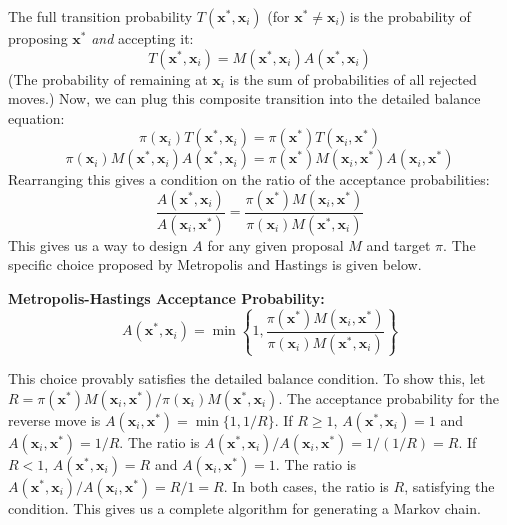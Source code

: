 The full transition probability $T(\mathbf{x}^*, \mathbf{x}_i)$ (for $\mathbf{x}^* \neq \mathbf{x}_i$) is the probability of proposing $\mathbf{x}^*$ \emph{and} accepting it:
\begin{equation}
    T(\mathbf{x}^*, \mathbf{x}_i) = M(\mathbf{x}^*, \mathbf{x}_i) A(\mathbf{x}^*, \mathbf{x}_i)
\end{equation}
(The probability of remaining at $\mathbf{x}_i$ is the sum of probabilities of all rejected moves.) Now, we can plug this composite transition into the detailed balance equation:
\begin{equation}
    \pi(\mathbf{x}_i) T(\mathbf{x}^*, \mathbf{x}_i) = \pi(\mathbf{x}^*) T(\mathbf{x}_i, \mathbf{x}^*)
\end{equation}
\begin{equation}
    \pi(\mathbf{x}_i) M(\mathbf{x}^*, \mathbf{x}_i) A(\mathbf{x}^*, \mathbf{x}_i) = \pi(\mathbf{x}^*) M(\mathbf{x}_i, \mathbf{x}^*) A(\mathbf{x}_i, \mathbf{x}^*)
\end{equation}
Rearranging this gives a condition on the ratio of the acceptance probabilities:
\begin{equation}
    \frac{A(\mathbf{x}^*, \mathbf{x}_i)}{A(\mathbf{x}_i, \mathbf{x}^*)} = \frac{\pi(\mathbf{x}^*) M(\mathbf{x}_i, \mathbf{x}^*)}{\pi(\mathbf{x}_i) M(\mathbf{x}^*, \mathbf{x}_i)}
\end{equation}
This gives us a way to design $A$ for any given proposal $M$ and target $\pi$. The specific choice proposed by Metropolis and Hastings is given below.
\begin{definitionBox}
    \textbf{Metropolis-Hastings Acceptance Probability:}
    \begin{equation}
        A(\mathbf{x}^*, \mathbf{x}_i) = \min \left\{ 1, \frac{\pi(\mathbf{x}^*) M(\mathbf{x}_i, \mathbf{x}^*)}{\pi(\mathbf{x}_i) M(\mathbf{x}^*, \mathbf{x}_i)} \right\}
    \end{equation}
\end{definitionBox}
This choice provably satisfies the detailed balance condition. To show this, let $R = \pi(\mathbf{x}^*) M(\mathbf{x}_i, \mathbf{x}^*)/\pi(\mathbf{x}_i) M(\mathbf{x}^*, \mathbf{x}_i)$. The acceptance probability for the reverse move is $A(\mathbf{x}_i, \mathbf{x}^*) = \min\{1, 1/R\}$. If $R \geq 1$, $A(\mathbf{x}^*, \mathbf{x}_i) = 1$ and $A(\mathbf{x}_i, \mathbf{x}^*) = 1/R$. The ratio is $A(\mathbf{x}^*, \mathbf{x}_i) / A(\mathbf{x}_i, \mathbf{x}^*) = 1 / (1/R) = R$. If $R < 1$, $A(\mathbf{x}^*, \mathbf{x}_i) = R$ and $A(\mathbf{x}_i, \mathbf{x}^*) = 1$. The ratio is $A(\mathbf{x}^*, \mathbf{x}_i) / A(\mathbf{x}_i, \mathbf{x}^*) = R / 1 = R$. In both cases, the ratio is $R$, satisfying the condition. This gives us a complete algorithm for generating a Markov chain.

